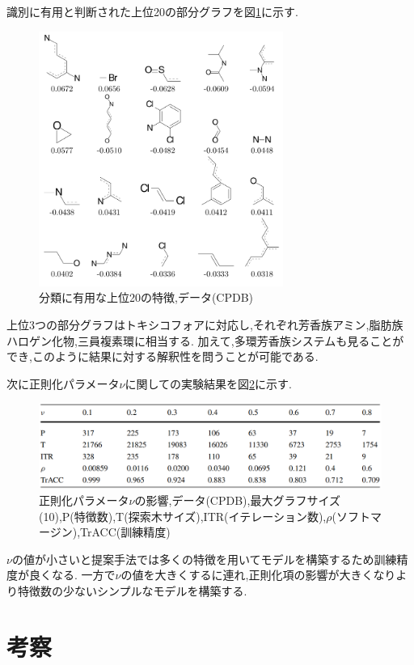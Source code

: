 \documentclass{zasshi-prml3}
\theoremstyle{definition}
\begin{document}
{識別に有用と判断された上位20の部分グラフを図\ref{top20features}に示す.
\begin{figure}[t]
	\centering
	\includegraphics[width=80mm]{figure/top20features.png}
	\caption{分類に有用な上位20の特徴,データ(CPDB)}
	\label{top20features}
\end{figure}
上位3つの部分グラフはトキシコフォアに対応し,それぞれ芳香族アミン,脂肪族ハロゲン化物,三員複素環に相当する.
加えて,多環芳香族システムも見ることができ,このように結果に対する解釈性を問うことが可能である.

次に正則化パラメータ$\nu$に関しての実験結果を図\ref{nu_parameter}に示す.
\begin{figure}[t]
	\centering
	\includegraphics[width=150mm]{figure/nu_parameter.png}
	\caption{正則化パラメータ$\nu$の影響,データ(CPDB),最大グラフサイズ(10),P(特徴数),T(探索木サイズ),ITR(イテレーション数),$\rho$(ソフトマージン),TrACC(訓練精度)}
	\label{nu_parameter}
\end{figure}
$\nu$の値が小さいと提案手法では多くの特徴を用いてモデルを構築するため訓練精度が良くなる.
一方で$\nu$の値を大きくするに連れ,正則化項の影響が大きくなりより特徴数の少ないシンプルなモデルを構築する.

\section{考察}

}
\end{document}
